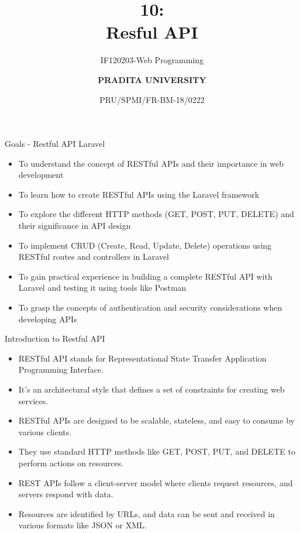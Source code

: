 \documentclass[aspectratio=169, table]{beamer}
\subtitle{IF120203-Web Programming}
\title{\Huge {\textbf{10: \\Resful API}}}
\date[Serial]{\scriptsize {PRU/SPMI/FR-BM-18/0222}}
\author[Pradita]{\small {\textbf{PRADITA UNIVERSITY}}}
\begin{document}
\begin{frame}
    \titlepage
\end{frame}

\begin{frame}{Goals - Restful API Laravel}
\vskip1cm
    \begin{itemize}
        \item To understand the concept of RESTful APIs and their importance in web development
        \item To learn how to create RESTful APIs using the Laravel framework
        \item To explore the different HTTP methods (GET, POST, PUT, DELETE) and their significance in API design
        \item To implement CRUD (Create, Read, Update, Delete) operations using RESTful routes and controllers in Laravel
        \item To gain practical experience in building a complete RESTful API with Laravel and testing it using tools like Postman
        \item To grasp the concepts of authentication and security considerations when developing APIs
    \end{itemize}
\end{frame}

\begin{frame}{Introduction to Restful API}
    \vskip1cm
    \begin{itemize}
        \item RESTful API stands for Representational State Transfer Application Programming Interface.
        \item It's an architectural style that defines a set of constraints for creating web services.
        \item RESTful APIs are designed to be scalable, stateless, and easy to consume by various clients.
        \item They use standard HTTP methods like GET, POST, PUT, and DELETE to perform actions on resources.
        \item REST APIs follow a client-server model where clients request resources, and servers respond with data.
        \item Resources are identified by URLs, and data can be sent and received in various formats like JSON or XML.
    \end{itemize}
\end{frame}
\end{document}
